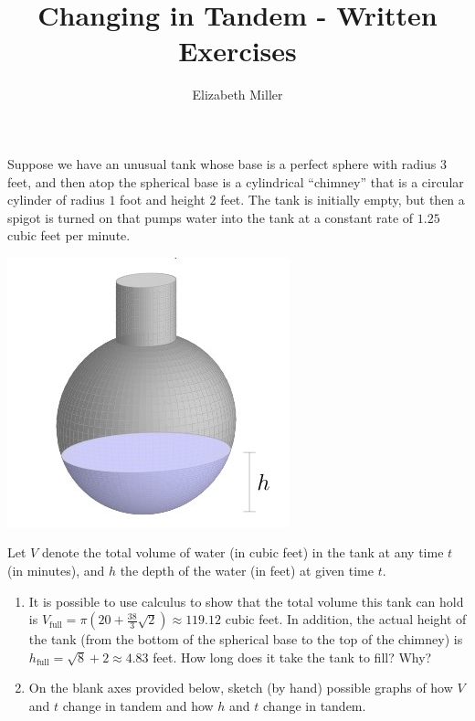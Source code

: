 \documentclass[handout]{ximera}
\author{Elizabeth Miller}
\title{Changing in Tandem - Written Exercises}
\begin{document}
\begin{abstract}
\end{abstract}
\maketitle




\begin{problem}
Suppose we have an unusual tank whose base is a perfect sphere with radius $3$ feet, and then atop the spherical base is a cylindrical ``chimney'' that is a circular cylinder of radius $1$ foot and height $2$ feet.  The tank is initially empty, but then a spigot is turned on that pumps water into the tank at a constant rate of $1.25$ cubic feet per minute.%

\includegraphics{CiT-WH1.jpg}

Let $V$ denote the total volume of water (in cubic feet) in the tank at any time $t$ (in minutes), and $h$ the depth of the water (in feet) at given time $t$.%

\begin{enumerate}[label=\alph*.]
\item It is possible to use calculus to show that the total volume this tank can hold is $V_{\text{full}} = \pi(20 + \frac{38}{3}\sqrt{2}) \approx 119.12$ cubic feet.  In addition, the actual height of the tank (from the bottom of the spherical base to the top of the chimney) is $h_{\text{full}} = \sqrt{8} + 2 \approx 4.83$ feet.  How long does it take the tank to fill?   Why?%
\item On the blank axes provided below, sketch (by hand) possible graphs of how $V$ and $t$ change in tandem and how $h$ and $t$ change in tandem.%


\end{enumerate}
\end{problem}
\end{document}
